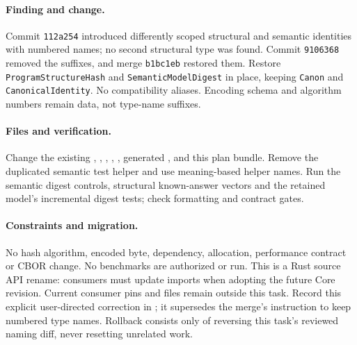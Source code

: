 \documentclass[11pt,a4paper]{article}
\begin{document}
\paragraph{Finding and change.} Commit \texttt{112a254} introduced differently scoped
structural and semantic identities with numbered names; no second structural type
was found. Commit \texttt{9106368} removed the suffixes, and merge \texttt{b1bc1eb}
restored them. Restore \texttt{ProgramStructureHash} and \texttt{SemanticModelDigest}
in place, keeping \texttt{Canon} and \texttt{CanonicalIdentity}. No compatibility aliases.
Encoding schema and algorithm numbers remain data, not type-name suffixes.

\paragraph{Files and verification.} Change the existing
,
,
,
,
, generated , and this plan bundle.
Remove the duplicated semantic test helper and use meaning-based helper names.
Run the semantic digest controls, structural known-answer vectors and the retained
model's incremental digest tests; check formatting and contract gates.

\paragraph{Constraints and migration.} No hash algorithm, encoded byte, dependency,
allocation, performance contract or CBOR change. No benchmarks are authorized or run.
This is a Rust source API rename: consumers must update imports when adopting the
future Core revision. Current consumer pins and files remain outside this task.
Record this explicit user-directed correction in ; it supersedes
the merge's instruction to keep numbered type names. Rollback consists only of
reversing this task's reviewed naming diff, never resetting unrelated work.


\end{document}
